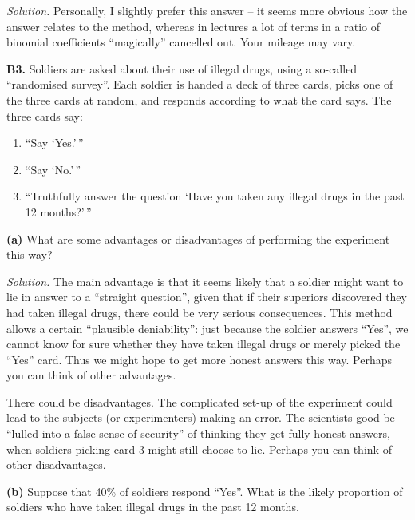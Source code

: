 \documentclass[
  a4paper,
]{book}
\providecommand{\tightlist}{%
  \setlength{\itemsep}{0pt}\setlength{\parskip}{0pt}}
\theoremstyle{definition}
\theoremstyle{definition}
\theoremstyle{definition}
\theoremstyle{definition}
\theoremstyle{remark}
\begin{document}
\begin{myanswers}
\emph{Solution.} Personally, I slightly prefer this answer -- it seems more obvious how the answer relates to the method, whereas in lectures a lot of terms in a ratio of binomial coefficients ``magically'' cancelled out. Your mileage may vary.

\end{myanswers}

\textbf{B3.} Soldiers are asked about their use of illegal drugs, using a so-called ``randomised survey''. Each soldier is handed a deck of three cards, picks one of the three cards at random, and responds according to what the card says. The three cards say:

\begin{enumerate}
\def\labelenumi{\arabic{enumi}.}
\tightlist
\item
  ``Say `Yes.'\,''
\item
  ``Say `No.'\,''
\item
  ``Truthfully answer the question `Have you taken any illegal drugs in the past 12 months?'\,''
\end{enumerate}

\textbf{(a)} What are some advantages or disadvantages of performing the experiment this way?

\begin{myanswers}
\emph{Solution.} The main advantage is that it seems likely that a soldier might want to lie in answer to a ``straight question'', given that if their superiors discovered they had taken illegal drugs, there could be very serious consequences. This method allows a certain ``plausible deniability'': just because the soldier answers ``Yes'', we cannot know for sure whether they have taken illegal drugs or merely picked the ``Yes'' card. Thus we might hope to get more honest answers this way. Perhaps you can think of other advantages.

There could be disadvantages. The complicated set-up of the experiment could lead to the subjects (or experimenters) making an error. The scientists good be ``lulled into a false sense of security'' of thinking they get fully honest answers, when soldiers picking card 3 might still choose to lie. Perhaps you can think of other disadvantages.

\end{myanswers}

\textbf{(b)} Suppose that 40\% of soldiers respond ``Yes''. What is the likely proportion of soldiers who have taken illegal drugs in the past 12 months.
\end{document}
